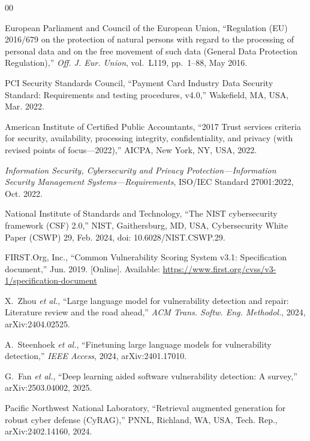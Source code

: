 \documentclass[conference]{IEEEtran}
\begin{document}
\begin{thebibliography}{00}

European Parliament and Council of the European Union, ``Regulation (EU)
2016/679 on the protection of natural persons with regard to the processing of
personal data and on the free movement of such data (General Data Protection
Regulation),'' \textit{Off. J. Eur. Union}, vol.~L119, pp.~1--88, May 2016.

PCI Security Standards Council, ``Payment Card Industry Data Security Standard:
Requirements and testing procedures, v4.0,'' Wakefield, MA, USA, Mar. 2022.

American Institute of Certified Public Accountants, ``2017 Trust services
criteria for security, availability, processing integrity, confidentiality, and
privacy (with revised points of focus---2022),'' AICPA, New York, NY, USA, 2022.

\textit{Information Security, Cybersecurity and Privacy Protection---Information
Security Management Systems---Requirements}, ISO/IEC Standard 27001:2022, Oct.
2022.

National Institute of Standards and Technology, ``The NIST cybersecurity
framework (CSF) 2.0,'' NIST, Gaithersburg, MD, USA, Cybersecurity White Paper
(CSWP) 29, Feb. 2024, doi: 10.6028/NIST.CSWP.29.

FIRST.Org, Inc., ``Common Vulnerability Scoring System v3.1: Specification
document,'' Jun. 2019. [Online]. Available:
\url{https://www.first.org/cvss/v3-1/specification-document}

X.~Zhou \textit{et al.}, ``Large language model for vulnerability detection and
repair: Literature review and the road ahead,'' \textit{ACM Trans. Softw. Eng.
Methodol.}, 2024, arXiv:2404.02525.

A.~Steenhoek \textit{et al.}, ``Finetuning large language models for
vulnerability detection,'' \textit{IEEE Access}, 2024, arXiv:2401.17010.

G.~Fan \textit{et al.}, ``Deep learning aided software vulnerability detection:
A survey,'' arXiv:2503.04002, 2025.

Pacific Northwest National Laboratory, ``Retrieval augmented generation for
robust cyber defense (CyRAG),'' PNNL, Richland, WA, USA, Tech. Rep.,
arXiv:2402.14160, 2024.


\end{thebibliography}
\end{document}
